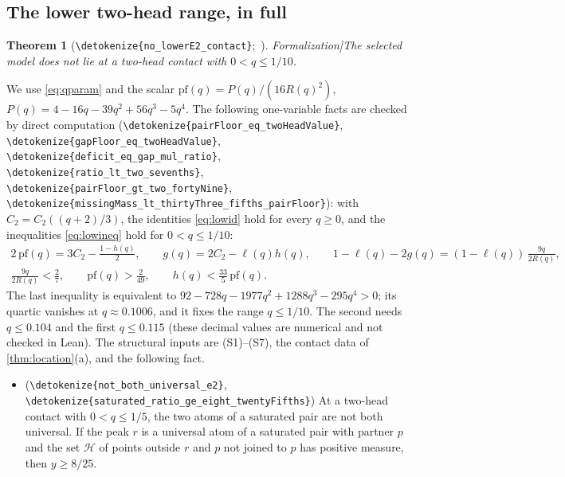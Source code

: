 \documentclass[10pt]{article}
\newtheorem{theorem}{Theorem}[section]
\theoremstyle{definition}
\theoremstyle{remark}
\numberwithin{equation}{section}
\newcommand{\Hole}{\mathcal{H}}
\newcommand{\leanid}[1]{\expandafter\nolinkurl\expandafter{\detokenize{#1}}}
\newcommand{\Fm}[1]{\cite[#1]{Formalization}}
\begin{document}
\subsection{The lower two-head range, in full}\label{sec:lowerE2}

\begin{theorem}[{\leanid{no_lowerE2_contact}};~\Fm{\S10.2}]\label{thm:lowerE2}
The selected model does not lie at a two-head contact with $0<q\le1/10$.
\end{theorem}

We use \eqref{eq:qparam} and the scalar $\mathrm{pf}(q)=P(q)/(16R(q)^2)$, $P(q)=4-16q-39q^2+56q^3-5q^4$. The following one-variable facts are checked by direct computation (\leanid{pairFloor_eq_twoHeadValue}, \leanid{gapFloor_eq_twoHeadValue}, \leanid{deficit_eq_gap_mul_ratio}, \leanid{ratio_lt_two_sevenths}, \leanid{pairFloor_gt_two_fortyNine}, \leanid{missingMass_lt_thirtyThree_fifths_pairFloor}): with $C_2=C_2((q+2)/3)$, the identities \eqref{eq:lowid} hold for every $q\ge0$, and the inequalities \eqref{eq:lowineq} hold for $0<q\le1/10$:
\begin{gather}
 2\,\mathrm{pf}(q)=3C_2-\tfrac{1-h(q)}2,\qquad g(q)=2C_2-\ell(q)h(q),\qquad 1-\ell(q)-2g(q)=(1-\ell(q))\,\frac{9q}{2R(q)},\label{eq:lowid}\\
 \frac{9q}{2R(q)}<\frac27,\qquad \mathrm{pf}(q)>\frac2{49},\qquad h(q)<\frac{33}5\,\mathrm{pf}(q).\label{eq:lowineq}
\end{gather}
The last inequality is equivalent to $92-728q-1977q^2+1288q^3-295q^4>0$; its quartic vanishes at $q\approx0.1006$, and it fixes the range $q\le1/10$. The second needs $q\le0.104$ and the first $q\le0.115$ (these decimal values are numerical and not checked in Lean). The structural inputs are (S1)--(S7), the contact data of \cref{thm:location}(a), and the following fact.
\begin{itemize}[leftmargin=1.5em]
\item[(U)] (\leanid{not_both_universal_e2}, \leanid{saturated_ratio_ge_eight_twentyFifths}) At a two-head contact with $0<q\le1/5$, the two atoms of a saturated pair are not both universal. If the peak $r$ is a universal atom of a saturated pair with partner $p$ and the set $\Hole$ of points outside $r$ and $p$ not joined to $p$ has positive measure, then $y\ge8/25$.
\end{itemize}
\end{document}
